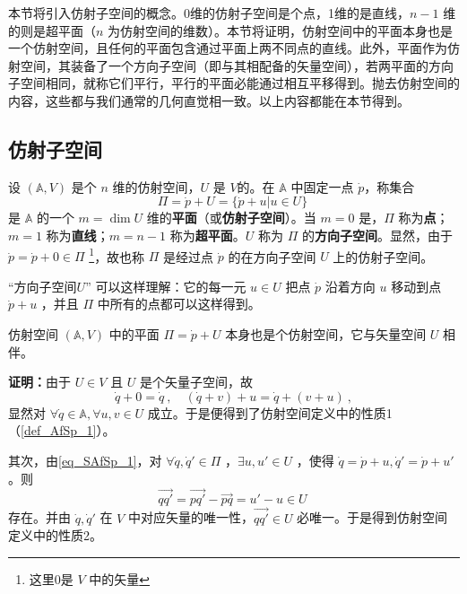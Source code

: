 
\begin{issues}
\end{issues}

本节将引入仿射子空间的概念。0维的仿射子空间是个点，1维的是直线，$n-1$ 维的则是超平面（$n$ 为仿射空间的维数）。本节将证明，仿射空间中的平面本身也是一个仿射空间，且任何的平面包含通过平面上两不同点的直线。此外，平面作为仿射空间，其装备了一个方向子空间（即与其相配备的矢量空间），若两平面的方向子空间相同，就称它们平行，平行的平面必能通过相互平移得到。抛去仿射空间的内容，这些都与我们通常的几何直觉相一致。以上内容都能在本节得到。
\subsection{仿射子空间}
\begin{definition}{}\label{def_SAfSp_1}
设 $(\mathbb A,V)$ 是个 $n$ 维的仿射空间，$U$ 是 $V$的。在 $\mathbb A$ 中固定一点 $\dot p$，称集合
\begin{equation}\label{eq_SAfSp_1}
\Pi=\dot p+U=\{\dot p+u|u\in U\}~
\end{equation}
是 $\mathbb A$ 的一个 $m=\dim U$ 维的\textbf{平面}（或\textbf{仿射子空间}）。当 $m=0$ 是，$\Pi$ 称为\textbf{点}；$m=1$ 称为\textbf{直线}；$m=n-1$ 称为\textbf{超平面}。$U$ 称为 $\Pi$ 的\textbf{方向子空间}。显然，由于 $\dot p=\dot p+0\in \Pi$ \footnote{这里0是 $V$ 中的矢量}，故也称 $\Pi$ 是经过点 $\dot p$ 的在方向子空间 $U$ 上的仿射子空间。
\end{definition}
“方向子空间$U$” 可以这样理解：它的每一元 $u\in U$ 把点 $\dot p$ 沿着方向 $u$ 移动到点 $\dot p+u$ ，并且 $\Pi$ 中所有的点都可以这样得到。

\begin{theorem}{}
仿射空间 $(\mathbb A,V)$ 中的平面 $\Pi=\dot p+U$ 本身也是个仿射空间，它与矢量空间 $U$ 相伴。
\end{theorem}
\textbf{证明：}由于 $U\in V$ 且 $U$ 是个矢量子空间，故
\begin{equation}
\dot q+0=\dot q~,\quad (\dot q+v)+u=\dot q+(v+u)~,
\end{equation}
显然对 $\forall \dot q\in\mathbb A,\forall u,v\in U$ 成立。于是便得到了仿射空间定义中的性质1（\autoref{def_AfSp_1}）。

其次，由\autoref{eq_SAfSp_1}，对 $\forall \dot q,\dot q'\in\Pi$ ，$\exists u,u'\in U$ ，使得 $\dot q=\dot p+u,\dot q'=\dot p+u'$。则
\begin{equation}
\overrightarrow{qq'}=\overrightarrow{pq'}-\overrightarrow{pq}=u'-u\in U~
\end{equation}
存在。并由 $\dot q,\dot q'$ 在 $V$ 中对应矢量的唯一性，$\overrightarrow{qq'}\in U$ 必唯一。于是得到仿射空间定义中的性质2。

